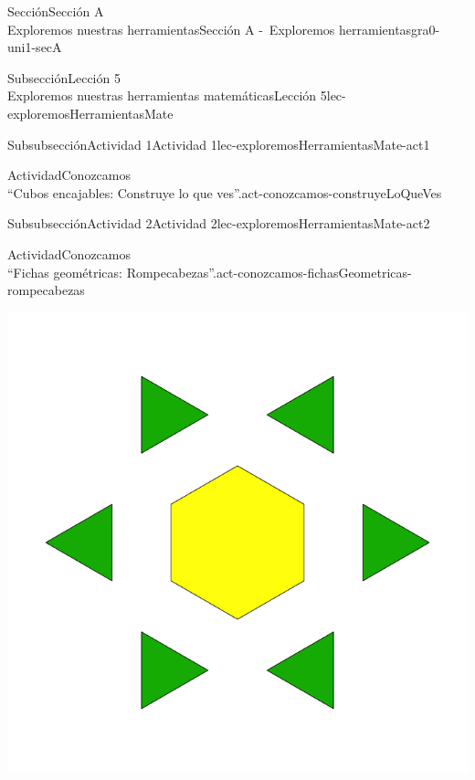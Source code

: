 \begin{sectionptx}{Sección}{{\Large Sección A\\}Exploremos nuestras herramientas}{}{Sección A -~Exploremos herramientas}{}{}{gra0-uni1-secA}
\begin{subsectionptx}{Subsección}{{\normalsize Lección 5\\[-0.05cm]}Exploremos nuestras herramientas matemáticas}{}{Lección 5}{}{}{lec-exploremosHerramientasMate}
\begin{subsubsectionptx}{Subsubsección}{Actividad 1}{}{Actividad 1}{}{}{lec-exploremosHerramientasMate-act1}
\begin{activity}{Actividad}{Conozcamos\\“Cubos encajables: Construye lo que ves”.}{act-conozcamos-construyeLoQueVes}%
%
\end{activity}%
\end{subsubsectionptx}
%
%
\typeout{************************************************}
\typeout{************************************************}
%
\begin{subsubsectionptx}{Subsubsección}{Actividad 2}{}{Actividad 2}{}{}{lec-exploremosHerramientasMate-act2}
\begin{activity}{Actividad}{Conozcamos\\“Fichas geométricas: Rompecabezas”.}{act-conozcamos-fichasGeometricas-rompecabezas}%
\begin{image}{0}{1}{0}{}%
\includegraphics[width=0.5\linewidth, center]{external/svg-source/tikz-file-148147.pdf}
\end{image}%
\end{activity}%

\end{subsubsectionptx}
\end{subsectionptx}
\end{sectionptx}

